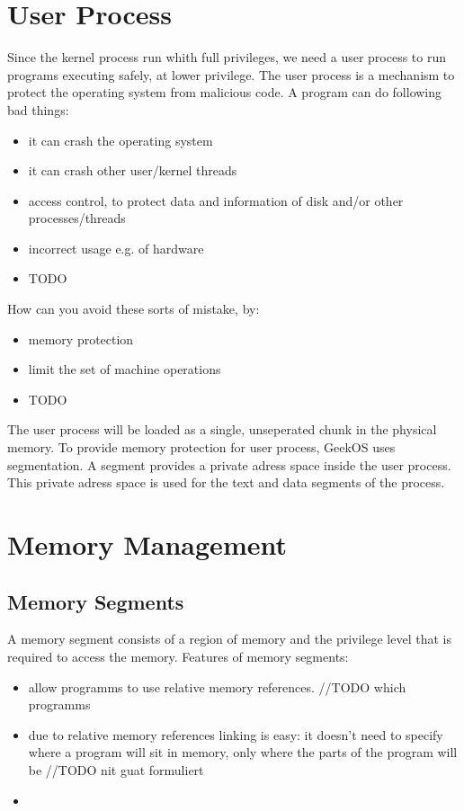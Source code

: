 \section{User Process}

Since the kernel process run whith full privileges, we need a user process to run programs executing safely, at lower privilege.
The user process is a mechanism to protect the operating system from malicious code. A program can do following bad things:
\begin{itemize}
  \item it can crash the operating system
  \item it can crash other user/kernel threads
  \item access control, to protect data and information of disk and/or other processes/threads
  \item incorrect usage e.g. of hardware
  \item TODO
\end{itemize}
How can you avoid these sorts of mistake, by:
\begin{itemize}
  \item memory protection
  \item limit the set of machine operations
  \item TODO
\end{itemize}
The user process will be loaded as a single, unseperated chunk in the physical memory.
To provide memory protection for user process, GeekOS uses segmentation.
A segment provides a private adress space inside the user process. This private adress space is used for the text and data segments of the process.



\section{Memory Management}

\subsection{Memory Segments}
A memory segment consists of a region of memory and the privilege level that is required to access the memory.
Features of memory segments:
\begin{itemize}
  \item allow programms to use relative memory references. //TODO which programms
  \item due to relative memory references linking is easy: it doesn't need to specify where a program will sit in memory, only where the parts of the program will be //TODO nit guat formuliert
  \item 
\end{itemize}




